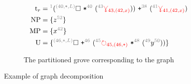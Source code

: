 {\begin{figure}
\begin{subfigure}{.5\textwidth}
    \centering
    \begin{align*}
      \text{t}_r & = \eid{1}{}  (\emptyHole{(40,\texttt{*},L)}~\texttt{*}^{\id{40}}~(\eid{43}{}\multiVertex{43,(42,x)}))~\texttt{+}^{\id{38}}~(\eid{41}{}\multiVertex{41,(42,x)})\\
      \text{NP} & = \{ \eid{52}{z} \} \\
      \text{MP} & = \{ \eid{42}{x} \} \\
      \text{U} & = \{ \emptyHole{(46,\texttt{+},L)}~\texttt{+}^{\id{46}}~(\eid{45}{}\cycleVertex{45,(46,\texttt{+})}~\texttt{*}^{\id{48}}~(\eid{49}{}y^{\id{50}})) \}
    \end{align*}
    \caption{The partitioned grove corresponding to the graph}%
    \label{fig:Decomposition example partitioned grove}
  \end{subfigure}
  \caption{Example of graph decomposition}%
  \label{fig:Decomposition example}
\end{figure}
}
